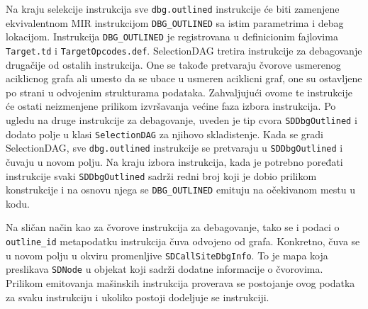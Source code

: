 \documentclass[12pt,oneside]{memoir}
\begin{document}
Na kraju selekcije instrukcija sve \verb|dbg.outlined| instrukcije će biti zamenjene ekvivalentnom MIR instrukcijom \verb|DBG_OUTLINED| sa istim parametrima i debag lokacijom.
Instrukcija \verb|DBG_OUTLINED| je registrovana u definicionim fajlovima \verb|Target.td| i \verb|TargetOpcodes.def|.
SelectionDAG tretira instrukcije za debagovanje drugačije od ostalih instrukcija. 
One se takođe pretvaraju čvorove usmerenog aciklicnog grafa ali 
umesto da se ubace u usmeren aciklicni graf, one su ostavljene po strani u odvojenim strukturama podataka. %
Zahvaljujući ovome te instrukcije će ostati neizmenjene prilikom izvršavanja većine faza izbora instrukcija.
Po ugledu na druge instrukcije za debagovanje, uveden je tip cvora \verb|SDDbgOutlined| i dodato polje u klasi \verb|SelectionDAG| za njihovo skladistenje.
Kada se gradi SelectionDAG, sve \verb|dbg.outlined| instrukcije se pretvaraju u \verb|SDDbgOutlined| i čuvaju u novom polju.
Na kraju izbora instrukcija, kada je potrebno poređati instrukcije svaki \verb|SDDbgOutlined| sadrži redni broj koji je dobio prilikom konstrukcije i na osnovu njega se \verb|DBG_OUTLINED| emituju na očekivanom mestu u kodu.

Na sličan način kao za čvorove instrukcija za debagovanje, tako se i podaci o \verb|outline_id| metapodatku instrukcija čuva odvojeno od grafa.
Konkretno, čuva se u novom polju u okviru promenljive \verb|SDCallSiteDbgInfo|. %
To je mapa koja preslikava \verb|SDNode| u objekat koji sadrži dodatne informacije o čvorovima.
Prilikom emitovanja mašinskih instrukcija proverava se postojanje ovog podatka za svaku instrukciju i ukoliko postoji dodeljuje se instrukciji.
\end{document}

